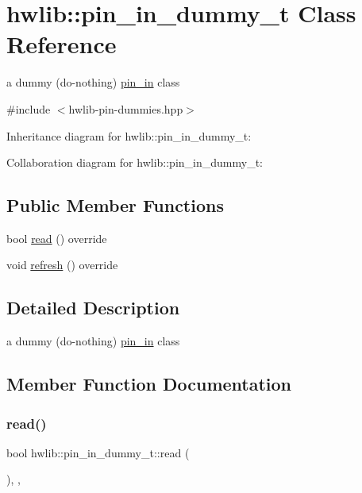 \hypertarget{classhwlib_1_1pin__in__dummy__t}{}\section{hwlib\+:\+:pin\+\_\+in\+\_\+dummy\+\_\+t Class Reference}
\label{classhwlib_1_1pin__in__dummy__t}


a dummy (do-\/nothing) \hyperlink{classhwlib_1_1pin__in}{pin\+\_\+in} class  




{\ttfamily \#include $<$hwlib-\/pin-\/dummies.\+hpp$>$}



Inheritance diagram for hwlib\+:\+:pin\+\_\+in\+\_\+dummy\+\_\+t\+:


Collaboration diagram for hwlib\+:\+:pin\+\_\+in\+\_\+dummy\+\_\+t\+:
\subsection*{Public Member Functions}
\begin{DoxyCompactItemize}
\item 
bool \hyperlink{classhwlib_1_1pin__in__dummy__t_a669c06692e3742532f8887771ae8feb1}{read} () override
\item 
void \hyperlink{classhwlib_1_1pin__in__dummy__t_ab890235f6b613aac58d6aef96d3460a3}{refresh} () override
\end{DoxyCompactItemize}


\subsection{Detailed Description}
a dummy (do-\/nothing) \hyperlink{classhwlib_1_1pin__in}{pin\+\_\+in} class 

\subsection{Member Function Documentation}
\mbox{\label{classhwlib_1_1pin__in__dummy__t_a669c06692e3742532f8887771ae8feb1}} 
\subsubsection{\texorpdfstring{read()}{read()}}
{\footnotesize\ttfamily bool hwlib\+::pin\+\_\+in\+\_\+dummy\+\_\+t\+::read (\begin{DoxyParamCaption}{ }\end{DoxyParamCaption})\hspace{0.3cm}{\ttfamily [inline]}, {\ttfamily [override]}, {\ttfamily [virtual]}}





